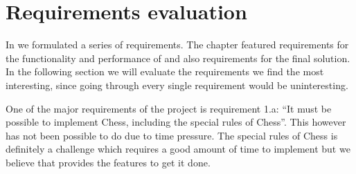 \section{Requirements evaluation}
\label{sec:requirementsevaluation}

In  we formulated a series of requirements. The chapter featured requirements for the functionality and performance of \productname{} and also requirements for the final solution. In the following section we will evaluate the requirements we find the most interesting, since going through every single requirement would be uninteresting. 

One of the major requirements of the project is requirement 1.a: ``It must be possible to implement Chess, including the special rules of Chess''. This however has not been possible to do due to time pressure. The special rules of Chess is definitely a challenge which requires a good amount of time to implement but we believe that \productname{} provides the features to get it done.   